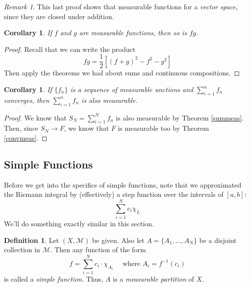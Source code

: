 \documentclass[12pt]{article}
\theoremstyle{plain}
\newtheorem{cor}[thm]{Corollary}
\theoremstyle{definition}
\newtheorem{defn}[thm]{Definition}
\theoremstyle{remark}
\newtheorem*{rmk}{Remark}
\begin{document}
\begin{rmk}
This last proof shows that measurable functions for a \emph{vector space}, since they are closed under addition.
\end{rmk}

\begin{cor}
If $f$ and $g$ are measurable functions, then so is $fg$.
\end{cor}
\begin{proof}
Recall that we can write the product
\[ 
    fg = \frac{1}{2}\left[(f+g)^2 - f^2 - g^2\right]
\]
Then apply the theorems we had about sums and continuous compositions.
\end{proof}

\begin{cor}
If $\{f_n\}$ is a sequence of measurable unctions and $\sum^n_{i=1} f_n$ converges, then $\sum^n_{i=1} f_n$ is also measurable. 
\end{cor}
\begin{proof}
We know that $S_N = \sum^N_{i=1} f_n$ is also measurable by Theorem \ref{summeas}. Then, since $S_N\rightarrow F$, we know that $F$ is measurable too by Theorem \ref{convmeas}.
\end{proof}

\subsection{Simple Functions}

Before we get into the specifics of simple functions, note that we approximated the Riemann integral by (effectively) a step function over the intervals of $[a,b]$:
    \[ \sum^N_{i=1} c_i \chi_{I_i} \]
We'll do something exactly similar in this section.

\begin{defn}
Let $(X,\mathscr{M})$ be given. Also let $A=\{A_1, \ldots, A_N\}$ be a disjoint collection in $\mathscr{M}$. Then any function of the form 
\[ 
    f = \sum^N_{i=1} c_i \cdot \chi_{A_i} \quad
    \text{ where } A_i = f^{-1}(c_i)
\]
is called a \emph{simple function}. Thus, $A$ is a \emph{measurable partition} of $X$.
\end{defn}
\end{document}
